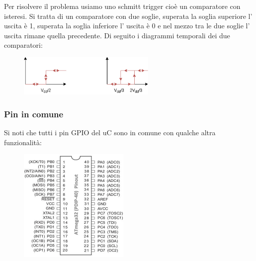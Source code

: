 Per risolvere il problema usiamo uno schmitt trigger cioè un comparatore con isteresi.
Si tratta di un comparatore con due soglie, superata la soglia superiore l' uscita è 1, superata la soglia inferiore l' uscita è 0 e nel mezzo tra le due soglie l' uscita rimane quella precedente.
Di seguito i diagrammi temporali dei due comparatori:
\begin{figure}[H]
    \centering
    \includegraphics[width=250px]{images/21_GPIO/comparator_time_graphs.png}
\end{figure}

\subsubsection{Pin in comune}
Si noti che tutti i pin GPIO del uC sono in comune con qualche altra funzionalità:
\begin{figure}[H]
    \centering
    \includegraphics[width=200px]{images/21_GPIO/atmega32-pinout.jpg}
\end{figure}

